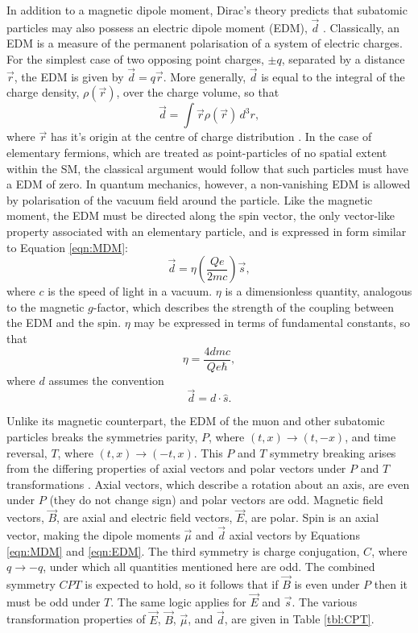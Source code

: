In addition to a magnetic dipole moment, Dirac's theory predicts that subatomic particles may also possess an electric dipole moment (EDM), $\vec{d}$ \cite{LeptonDipoleMoments}. Classically, an EDM is a measure of the permanent polarisation of a system of electric charges. For the simplest case of two opposing point charges, $\pm q$, separated by a distance $\vec{r}$, the EDM is given by $\vec{d}=q\vec{r}$. More generally, $\vec{d}$ is equal to the integral of the charge density, $\rho(\vec{r})$, over the charge volume, so that
%
\begin{equation} 
  \vec{d} = \int{\vec{r}\rho(\vec{r})\,d^{3}r},
  \label{eqn:EDMIntegral}
\end{equation}
%
where $\vec{r}$ has it's origin at the centre of charge distribution \cite{Jackson}. In the case of elementary fermions, which are treated as point-particles of no spatial extent within the SM, the classical argument would follow that such particles must have a EDM of zero. In quantum mechanics, however, a non-vanishing EDM is allowed by polarisation of the vacuum field around the particle. Like the magnetic moment, the EDM must be directed along the spin vector, the only vector-like property associated with an elementary particle, and is expressed in form similar to Equation \ref{eqn:MDM}:
%
\begin{equation} 
  \vec{d} = \eta \left(\frac{Qe}{2mc}\right)\vec{s},
  \label{eqn:EDM}
\end{equation}
%
where $c$ is the speed of light in a vacuum. $\eta$ is a dimensionless quantity, analogous to the magnetic $g$-factor, which describes the strength of the coupling between the EDM and the spin. $\eta$ may be expressed in terms of fundamental constants, so that
%
\begin{equation} 
  \eta = \frac{4dmc}{Qe\hbar},
  \label{eqn:eta}
\end{equation}
%
where $d$ assumes the convention
%
\begin{equation} 
  \vec{d} = d\cdot\hat{s}.
  \label{eqn:scalarEDM}
\end{equation}

Unlike its magnetic counterpart, the EDM of the muon and other subatomic particles breaks the symmetries parity, $P$, where $(t,x)\rightarrow(t,-x)$, and time reversal, $T$, where $(t,x)\rightarrow(-t,x)$. This $P$ and $T$ symmetry breaking arises from the differing properties of axial vectors and polar vectors under $P$ and $T$ transformations \cite{LeptonDipoleMoments}. Axial vectors, which describe a rotation about an axis, are even under $P$ (they do not change sign) and polar vectors are odd. Magnetic field vectors, $\vec{B}$, are axial and electric field vectors, $\vec{E}$, are polar. Spin is an axial vector, making the dipole moments $\vec{\mu}$ and $\vec{d}$ axial vectors by Equations \ref{eqn:MDM} and \ref{eqn:EDM}. The third symmetry is charge conjugation, $C$, where $q\rightarrow-q$, under which all quantities mentioned here are odd. The combined symmetry $CPT$ is expected to hold, so it follows that if $\vec{B}$ is even under $P$ then it must be odd under $T$. The same logic applies for $\vec{E}$ and $\vec{s}$. The various transformation properties of $\vec{E}$, $\vec{B}$, $\vec{\mu}$, and $\vec{d}$, are given in Table \ref{tbl:CPT}. 

